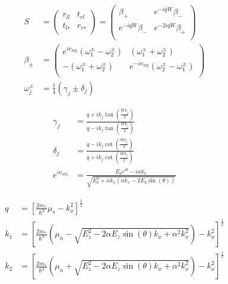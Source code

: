 \documentclass[english, twocolumn, 10pt, aps, superscriptaddress, floatfix, prb, citeautoscript]{revtex4-1}
\begin{document}
\begin{align}
\label{eq:smatrix}
    S &= \left(
    \begin{array}{rr}
    r_{ll}&t_{rl}\\
    t_{lr}&r_{rr}\\
    \end{array}
    \right) =
    \left(
    \begin{array}{rr}
    \beta_+ & e^{-i q W} \beta_-\\
    e^{-i q W} \beta_- & e^{-2 i q W} \beta_+\\
    \end{array}
    \right) 
    \\
    \beta_\pm &= \left(
    \begin{array}{rr}
    e^{i \nu_{\arg}}\left(\omega^\pm_1 - \omega^\pm_2\right) & (\omega^\pm _1 + \omega^\pm _2)\\
    -(\omega^\pm _1 + \omega^\pm _2) & e^{-i \nu _{\arg }} \left(\omega^\pm _2 - \omega^\pm _1\right)\\
    \end{array}
    \right)\\
    \omega^\pm_j &= \frac{1}{4} \left(\gamma _{j} \pm \delta _{j}\right)
\end{align}

\begin{align}
    \gamma_j &= \frac{q+i k_{j} \tan \left(\frac{W k_{j}}{2}\right)}{q-i k_{j} \tan \left(\frac{W k_{j}}{2}\right)} \\
    \delta_j &= \frac{q-i k_{j} \cot \left(\frac{W k_{j}}{2}\right)}{q+i k_{j} \cot \left(\frac{W k_{j}}{2}\right)}\\
    e^{i \nu_{\arg}} &= \frac{E_\text{z} e^{i \theta }-i \alpha  k_x}{\sqrt{E_\text{z}^2+\alpha  k_x \left(\alpha  k_x-2 E_\text{z} \sin (\theta )\right)}}
\end{align}
\begin{footnotesize}
\begin{align}
    q &= \left[ \frac{2 m_\ast}{\hbar ^2}\mu_s - k_x^2 \right]^\frac{1}{2}\\
    k_1 &= \left[ \frac{2 m_\ast}{\hbar^2} \left(\mu_n-\sqrt{E_z^2-2 \alpha  E_z \sin (\theta ) k_x+\alpha ^2 k_x^2}\right) - k_x^2 \right]^\frac{1}{2}\\
    k_2 &= \left[ \frac{2 m_\ast}{\hbar^2} \left(\mu_n+\sqrt{E_z^2-2 \alpha  E_z \sin (\theta ) k_x+\alpha ^2 k_x^2}\right) - k_x^2 \right]^\frac{1}{2}
\end{align}
\end{footnotesize}
\end{document}
